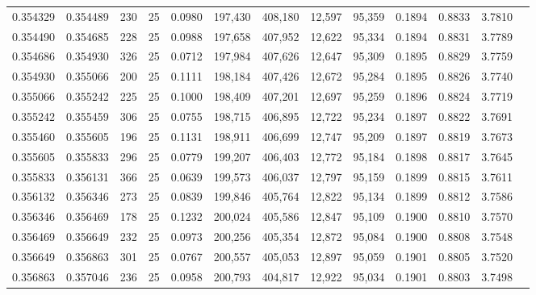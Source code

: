 \begin{tabular}{rrrrrrrrrrrrr}
0.354329 & 0.354489 &   230 &  25 &                                     0.0980 & 197,430 & 408,180 &  12,597 &  95,359 & 0.1894 & 0.8833 & 3.7810 \\
0.354490 & 0.354685 &   228 &  25 &                                     0.0988 & 197,658 & 407,952 &  12,622 &  95,334 & 0.1894 & 0.8831 & 3.7789 \\
0.354686 & 0.354930 &   326 &  25 &                                     0.0712 & 197,984 & 407,626 &  12,647 &  95,309 & 0.1895 & 0.8829 & 3.7759 \\
0.354930 & 0.355066 &   200 &  25 &                                     0.1111 & 198,184 & 407,426 &  12,672 &  95,284 & 0.1895 & 0.8826 & 3.7740 \\
0.355066 & 0.355242 &   225 &  25 &                                     0.1000 & 198,409 & 407,201 &  12,697 &  95,259 & 0.1896 & 0.8824 & 3.7719 \\
0.355242 & 0.355459 &   306 &  25 &                                     0.0755 & 198,715 & 406,895 &  12,722 &  95,234 & 0.1897 & 0.8822 & 3.7691 \\
0.355460 & 0.355605 &   196 &  25 &                                     0.1131 & 198,911 & 406,699 &  12,747 &  95,209 & 0.1897 & 0.8819 & 3.7673 \\
0.355605 & 0.355833 &   296 &  25 &                                     0.0779 & 199,207 & 406,403 &  12,772 &  95,184 & 0.1898 & 0.8817 & 3.7645 \\
0.355833 & 0.356131 &   366 &  25 &                                     0.0639 & 199,573 & 406,037 &  12,797 &  95,159 & 0.1899 & 0.8815 & 3.7611 \\
0.356132 & 0.356346 &   273 &  25 &                                     0.0839 & 199,846 & 405,764 &  12,822 &  95,134 & 0.1899 & 0.8812 & 3.7586 \\
0.356346 & 0.356469 &   178 &  25 &                                     0.1232 & 200,024 & 405,586 &  12,847 &  95,109 & 0.1900 & 0.8810 & 3.7570 \\
0.356469 & 0.356649 &   232 &  25 &                                     0.0973 & 200,256 & 405,354 &  12,872 &  95,084 & 0.1900 & 0.8808 & 3.7548 \\
0.356649 & 0.356863 &   301 &  25 &                                     0.0767 & 200,557 & 405,053 &  12,897 &  95,059 & 0.1901 & 0.8805 & 3.7520 \\
0.356863 & 0.357046 &   236 &  25 &                                     0.0958 & 200,793 & 404,817 &  12,922 &  95,034 & 0.1901 & 0.8803 & 3.7498 \\

\end{tabular}
